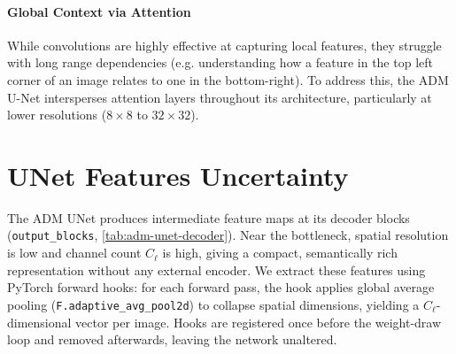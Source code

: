 \paragraph{Global Context via Attention}
While convolutions are highly effective at capturing local features, they struggle with long range dependencies (e.g. understanding how a feature in the top left corner of an image relates to one in the bottom-right). To address this, the \acs{ADM} U-Net intersperses attention layers throughout its architecture, particularly at lower resolutions ($8 \times 8$ to $32 \times 32$). 




\section{UNet Features Uncertainty}
\label{sec:bottleneck}

The \acs{ADM} UNet produces intermediate feature maps at its decoder blocks
(\texttt{output\_blocks}, \autoref{tab:adm-unet-decoder}). Near the bottleneck, spatial resolution is low and channel count $C_\ell$ is high, giving a compact, semantically rich representation without any external encoder. We extract these features using PyTorch forward hooks: for each forward pass,
the hook applies global average pooling (\texttt{F.adaptive\_avg\_pool2d}) to collapse
spatial dimensions, yielding a $C_\ell$-dimensional vector per image. Hooks are
registered once before the weight-draw loop and removed afterwards, leaving the network
unaltered.

